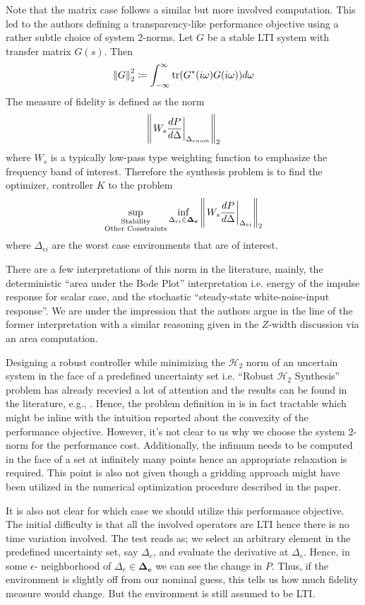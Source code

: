 Note that the matrix case follows a similar but more involved computation. This led to the authors defining 
a transparency-like performance objective using a rather subtle choice of system $2$-norms. Let $G$ be a 
stable LTI system with transfer matrix $G(s)$. Then 
\[
\displaystyle \left\| G \right\|_2^2 \coloneqq \int_{-\infty}^\infty{\operatorname{tr}(G^*(i\omega)G(i\omega))}d\omega
\] 
The measure of fidelity is defined as the norm
\[
\displaystyle \left\| \left.W_s\frac{dP}{d\Delta}\right|_{\Delta_{enom}} \right\|_2
\]
where $W_s$ is a typically low-pass type weighting function to emphasize the frequency band of interest. Therefore
the synthesis problem is to find the optimizer, controller $K$ to the problem
\[
\sup_{\substack{\text{Stability}\\\text{Other Constraints}}}\inf_{\Delta_{ei}\in\bm{\Delta_e}}
\displaystyle \left\| \left.W_s\frac{dP}{d\Delta}\right|_{\Delta_{ei}} \right\|_2
\]
where $\Delta_{ei}$ are the worst case environments that are of interest.


There are a few interpretations of this norm in the literature, mainly, the deterministic \enquote{area under the Bode
Plot} interpretation i.e. energy of the impulse response for scalar case, and the stochastic \enquote{steady-state 
white-noise-input response}. We are under the impression that the authors argue in the line of the former interpretation
with a similar reasoning given in the $Z$-width discussion via an area computation. 


Designing a robust controller while minimizing the $\mathcal{H}_2$ norm of an uncertain system in the face of a predefined 
uncertainty set i.e. \enquote{Robust $\mathcal{H}_2$ Synthesis} problem has already recevied a lot of attention and 
the results can be found in the literature, e.g., \cite{dullerud}. Hence, the problem definition in \cite{cavusoglu} is 
in fact tractable which might be inline with the intuition reported about the convexity of the performance objective. However, 
it's not clear to us why we choose the system $2$-norm for the performance cost. Additionally, the infimum needs to be 
computed in the face of a set at infinitely many points hence an appropriate relaxation is required. This point is also not 
given though a gridding approach might have been utilized in the numerical optimization procedure described in the paper.

It is also not clear for which case we should utilize this performance objective. The initial difficulty is that all the 
involved operators are LTI hence there is no time variation involved. The test reads as; we select an arbitrary element 
in the predefined uncertainty set, say $\Delta_e$, and evaluate the derivative at $\Delta_e$. Hence, in some $\epsilon$-
neighborhood of $\Delta_e\in\bm{\Delta_e}$ we can see the change in $P$. Thus, if the environment is slightly off from our 
nominal guess, this tells us how much fidelity measure would change. But the environment is still assumed to be LTI.


